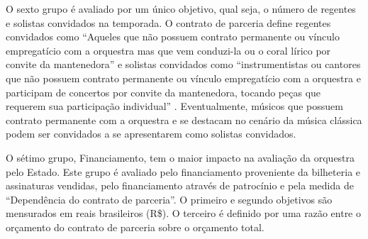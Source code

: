 \documentclass[a4paper, 12pt, openright, oneside, german, french, english, brazil]{abntex2}
\begin{document}
	
	O sexto grupo é avaliado por um único objetivo, qual seja, o número de regentes e solistas convidados na temporada. O contrato de parceria define regentes convidados como ``Aqueles que não possuem contrato permanente ou vínculo empregatício com a orquestra mas que vem conduzi-la ou o coral lírico por convite da mantenedora'' \cite[p. 40]{minas2017aditivo} e solistas convidados como ``instrumentistas ou cantores que não possuem contrato permanente ou vínculo empregatício com a orquestra e participam de concertos por convite da mantenedora, tocando peças que requerem sua participação individual''  \cite[p. 40]{minas2017aditivo}. Eventualmente, músicos que possuem contrato permanente com a orquestra e se destacam no cenário da música clássica podem ser convidados a se apresentarem como solistas convidados.
	
	
	O sétimo grupo, Financiamento, tem o maior impacto na avaliação da orquestra pelo Estado. Este grupo é avaliado pelo financiamento proveniente da bilheteria e assinaturas vendidas, pelo financiamento através de patrocínio e pela medida de ``Dependência do contrato de parceria''. O primeiro e segundo objetivos são mensurados em reais brasileiros (R\$). O terceiro é definido por uma razão entre o orçamento do contrato de parceria sobre o orçamento total.
	
\end{document}
